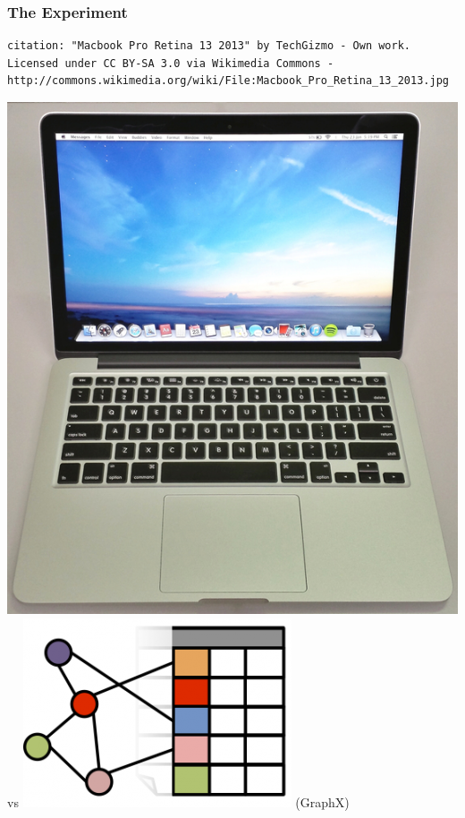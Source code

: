 \documentclass[aspectratio=43]{beamer}
\begin{document}
\begin{frame}[fragile]
  \frametitle{The Experiment}
{\tiny \begin{verbatim}citation: "Macbook Pro Retina 13 2013" by TechGizmo - Own work. 
Licensed under CC BY-SA 3.0 via Wikimedia Commons - 
http://commons.wikimedia.org/wiki/File:Macbook_Pro_Retina_13_2013.jpg
\end{verbatim}
}
\includegraphics[height=.4\textheight]{L36/Macbook_Pro_Retina_13_2013.jpg}
 \hspace*{1cm} vs \hspace*{1cm}
\includegraphics[height=.3\textheight]{L36/table_and_graph-300x211.png}
(GraphX)
\end{frame}
\end{document}
